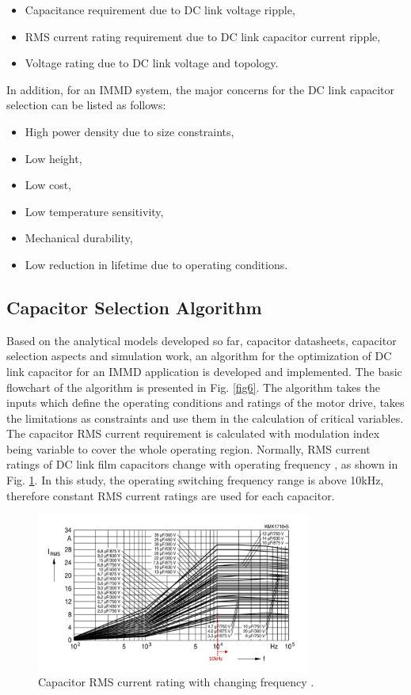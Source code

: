 \documentclass[conference,a4paper,twocolumn]{IEEEtran}
\begin{document}
\begin{itemize}
  \item Capacitance requirement due to DC link voltage ripple,
  \item RMS current rating requirement due to DC link capacitor current ripple,
  \item Voltage rating due to DC link voltage and topology.
\end{itemize}

In addition, for an IMMD system, the major concerns for the DC link capacitor selection can be listed as follows:

\begin{itemize}
  \item High power density due to size constraints,
  \item Low height,
  \item Low cost,
  \item Low temperature sensitivity,
  \item Mechanical durability,
  \item Low reduction in lifetime due to operating conditions.
\end{itemize}


\subsection{Capacitor Selection Algorithm}

Based on the analytical models developed so far, capacitor datasheets, capacitor selection aspects and simulation work, an algorithm for the optimization of DC link capacitor for an IMMD application is developed and implemented. The basic flowchart of the algorithm is presented in Fig. \ref{fig6}. The algorithm takes the inputs which define the operating conditions and ratings of the motor drive, takes the limitations as constraints and use them in the calculation of critical variables. The capacitor RMS current requirement is calculated with modulation index being variable to cover the whole operating region. Normally, RMS current ratings of DC link film capacitors change with operating frequency \cite{Polypropylene2009}, as shown in Fig. \ref{rms_f}. In this study, the operating switching frequency range is above 10kHz, therefore constant RMS current ratings are used for each capacitor.


\begin{figure}[h]
  \centering
  \includegraphics[width=9cm]{rms_f}
  \caption{Capacitor RMS current rating with changing frequency \cite{Polypropylene2009}.}
  \label{rms_f}
\end{figure}
\end{document}

